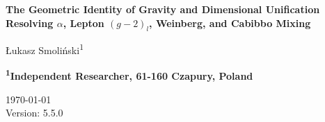 \documentclass[10pt,a4paper]{article}
\begin{document}
\begin{center}{\Large \textbf{
			{The Geometric Identity of Gravity and Dimensional Unification Resolving $\alpha$, Lepton $(g-2)_l$, Weinberg, and Cabibbo Mixing}
}}\end{center}

\begin{center}
Łukasz Smoliński\textsuperscript{1}
\end{center}

\begin{center}
\textbf{\textsuperscript{1}Independent Researcher, 61-160 Czapury, Poland}
\end{center}

\begin{center}
\end{center}

\begin{center}
\today \\
Version: 5.5.0	
\end{center}


\linenumbers
\end{document}
